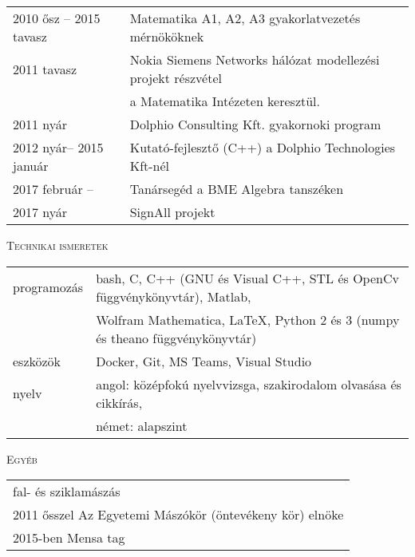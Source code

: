 \documentclass[12pt]{article}
\begin{document}
       \begin{tabular}{p{4cm}l}
	       2010 ősz -- 2015 tavasz & Matematika A1, A2, A3 gyakorlatvezetés mérnököknek\\
           2011 tavasz  & Nokia Siemens Networks hálózat modellezési projekt részvétel\\ & a Matematika Intézeten keresztül. \\
		   2011 nyár    & Dolphio Consulting Kft. gyakornoki program\\
		   2012 nyár-- 2015 január & Kutató-fejlesztő (C++) a Dolphio Technologies Kft-nél \\
           2017 február -- & Tanársegéd a BME Algebra tanszéken \\
           2017 nyár & SignAll projekt
       \end{tabular}
 
 \textsc{Technikai ismeretek}

    \begin{tabular}{p{3cm}l}
	       programozás & bash, C, C++ (GNU és Visual C++, STL és OpenCv függvénykönyvtár), Matlab, \\
                             & Wolfram Mathematica, \LaTeX, Python 2 és 3 (numpy és theano függvénykönyvtár) \\
           eszközök & Docker, Git, MS Teams, Visual Studio \\
           nyelv & angol: középfokú nyelvvizsga, szakirodalom olvasása és cikkírás, \\
                 & német: alapszint
   \end{tabular}
   
 \textsc{Egyéb}
 
    \begin{tabular}{l}
        fal- és sziklamászás\\
        2011 ősszel Az Egyetemi Mászókör (öntevékeny kör) elnöke \\
        2015-ben Mensa tag
   \end{tabular}
\end{document}
